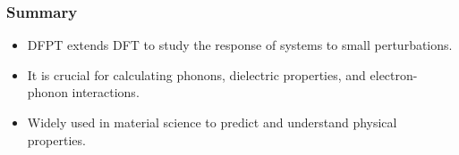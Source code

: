 \documentclass{CustomBeamer}
\begin{document}
    
    \begin{frame}
    \frametitle{Summary}
    \begin{itemize}
        \item DFPT extends DFT to study the response of systems to small perturbations.
        \item It is crucial for calculating phonons, dielectric properties, and electron-phonon interactions.
        \item Widely used in material science to predict and understand physical properties.
    \end{itemize}
    \end{frame}
    
 
\end{document}
